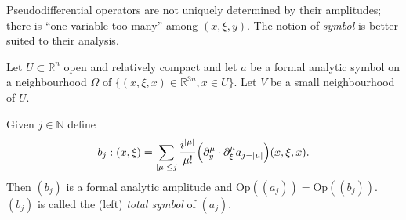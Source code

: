 \documentclass[10pt]{amsart}
\theoremstyle{definition}\newtheorem{defi}[theo]{Definition}\newtheorem{rema}[theo]{Remark}\newtheorem{exam}[theo]{Example}\newtheorem{exem}[theo]{Example}\newtheorem{nota}[theo]{Notation}
\newcommand{\Opp}{\mathrm{Op}}
\newcommand\1{\mathds{1}}
\newcommand{\R}{\mathbb{R}}
\newcommand{\N}{\mathbb{N}}
\let\originalleft\left
\let\originalright\right
\renewcommand{\left}{\mathopen{}\mathclose\bgroup\originalleft}
\renewcommand{\right}{\aftergroup\egroup\originalright}
\begin{document}
Pseudodifferential operators are not uniquely determined by their amplitudes; there is ``one variable too many'' among $(x,\xi,y)$. The notion of \emph{symbol} is better suited to their analysis.

\begin{prop}\label{prop:ampl_to_symb_pseudos}
Let $U\subset \R^n$ open and relatively compact and let $a$ be a formal analytic symbol on a neighbourhood $\Omega$ of $\{(x,\xi,x)\in \R^{3n},x\in U\}$. Let $V$ be a small neighbourhood of $U$.

Given $j\in \N$ define
\[
b_j:(x,\xi)=\sum_{|\mu|\leq j}\frac{i^{|\mu|}}{\mu!}\left(\partial_y^{\mu}\cdot
\partial_{\xi}^{\mu}a_{j-|\mu|}\right)(x,\xi,x).
\]
Then $(b_j)$ is a formal analytic amplitude and $\Opp((a_j))=\Opp((b_j))$. $(b_j)$ is called the (left)
\emph{total symbol} of $(a_j)$.
\end{prop}
\end{document}
